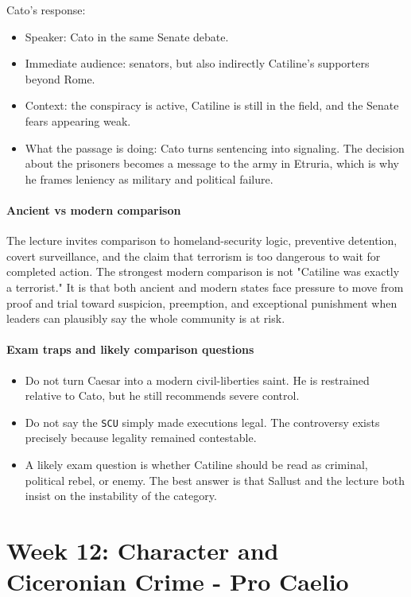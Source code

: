 \documentclass[11pt]{article}
\begin{document}
Cato's response:

\begin{itemize}
\item Speaker: Cato in the same Senate debate.
\item Immediate audience: senators, but also indirectly Catiline's supporters beyond Rome.
\item Context: the conspiracy is active, Catiline is still in the field, and the Senate fears appearing weak.
\item What the passage is doing: Cato turns sentencing into signaling. The decision about the prisoners becomes a message to the army in Etruria, which is why he frames leniency as military and political failure.
\end{itemize}

\paragraph{Ancient vs modern comparison}

The lecture invites comparison to homeland-security logic, preventive detention, covert surveillance, and the claim that terrorism is too dangerous to wait for completed action. The strongest modern comparison is not "Catiline was exactly a terrorist." It is that both ancient and modern states face pressure to move from proof and trial toward suspicion, preemption, and exceptional punishment when leaders can plausibly say the whole community is at risk.

\paragraph{Exam traps and likely comparison questions}

\begin{itemize}
\item Do not turn Caesar into a modern civil-liberties saint. He is restrained relative to Cato, but he still recommends severe control.
\item Do not say the \texttt{SCU} simply made executions legal. The controversy exists precisely because legality remained contestable.
\item A likely exam question is whether Catiline should be read as criminal, political rebel, or enemy. The best answer is that Sallust and the lecture both insist on the instability of the category.
\end{itemize}

\section{Week 12: Character and Ciceronian Crime - Pro Caelio}
\end{document}

